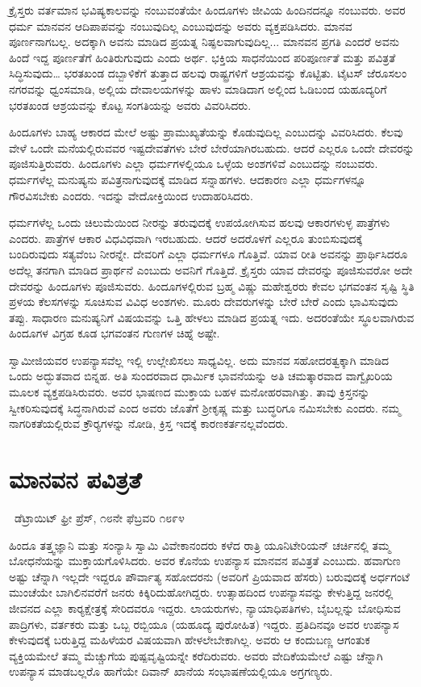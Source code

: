  ಕ್ರೈಸ್ತರು ವರ್ತಮಾನ ಭವಿಷ್ಯಕಾಲವನ್ನು ನಂಬುವಂತೆಯೇ ಹಿಂದೂಗಳು ಜೀವಿಯ ಹಿಂದಿನದನ್ನೂ ನಂಬುವರು. ಅವರ ಧರ್ಮ ಮಾನವನ ಆದಿಪಾಪವನ್ನು ನಂಬುವುದಿಲ್ಲ ಎಂಬುವುದನ್ನು ಅವರು ವ್ಯಕ್ತಪಡಿಸಿದರು. ಮಾನವ ಪೂರ್ಣನಾಗಬಲ್ಲ. ಅದಕ್ಕಾಗಿ ಅವನು ಮಾಡಿದ ಪ್ರಯತ್ನ ನಿಷ್ಫಲವಾಗುವುದಿಲ್ಲ... ಮಾನವನ ಪ್ರಗತಿ ಎಂದರೆ ಅವನು ಹಿಂದೆ ಇದ್ದ ಪೂರ್ಣತೆಗೆ ಹಿಂತಿರುಗುವುದು ಎಂದು ಅರ್ಥ. ಭಕ್ತಿಯ ಸಾಧನೆಯಿಂದ ಪರಿಪೂರ್ಣತೆ ಮತ್ತು ಪವಿತ್ರತೆ ಸಿದ್ಧಿಸುವುದು… ಭರತಖಂಡ ದಬ್ಬಾಳಿಕೆಗೆ ತುತ್ತಾದ ಹಲವು ರಾಷ್ಟ್ರಗಳಿಗೆ ಆಶ್ರಯವನ್ನು ಕೊಟ್ಟಿತು. ಟೈಟಸ್ ಜೆರೂಸಲಂ ನಗರವನ್ನು ಧ್ವಂಸಮಾಡಿ, ಅಲ್ಲಿಯ ದೇವಾಲಯಗಳನ್ನು ಹಾಳು ಮಾಡಿದಾಗ ಅಲ್ಲಿಂದ ಓಡಿಬಂದ ಯಹೂದ್ಯರಿಗೆ ಭರತಖಂಡ ಆಶ್ರಯವನ್ನು ಕೊಟ್ಟ ಸಂಗತಿಯನ್ನು ಅವರು ವಿವರಿಸಿದರು. 

 ಹಿಂದೂಗಳು ಬಾಹ್ಯ ಆಕಾರದ ಮೇಲೆ ಅಷ್ಟು ಪ್ರಾಮುಖ್ಯತೆಯನ್ನು ಕೊಡುವುದಿಲ್ಲ ಎಂಬುದನ್ನು ವಿವರಿಸಿದರು. ಕೆಲವು ವೇಳೆ ಒಂದೇ ಮನೆಯಲ್ಲಿರುವವರ ಇಷ್ಟದೇವತೆಗಳು ಬೇರೆ ಬೇರೆಯಾಗಿರಬಹುದು. ಆದರೆ ಎಲ್ಲರೂ ಒಂದೇ ದೇವರನ್ನು ಪೂಜಿಸುತ್ತಿರುವರು. ಹಿಂದೂಗಳು ಎಲ್ಲಾ ಧರ್ಮಗಳಲ್ಲಿಯೂ ಒಳ್ಳೆಯ ಅಂಶಗಳಿವೆ ಎಂಬುದನ್ನು ನಂಬುವರು. ಧರ್ಮಗಳೆಲ್ಲ ಮನುಷ್ಯನು ಪವಿತ್ರನಾಗುವುದಕ್ಕೆ ಮಾಡಿದ ಸನ್ನಾಹಗಳು. ಆದಕಾರಣ ಎಲ್ಲಾ ಧರ್ಮಗಳನ್ನೂ ಗೌರವಿಸಬೇಕು ಎಂದರು. ಇದನ್ನು ವೇದೋಕ್ತಿಯಿಂದ ಉದಾಹರಿಸಿದರು. 

 ಧರ್ಮಗಳೆಲ್ಲ ಒಂದು ಚಿಲುಮೆಯಿಂದ ನೀರನ್ನು ತರುವುದಕ್ಕೆ ಉಪಯೋಗಿಸುವ ಹಲವು ಆಕಾರಗಳುಳ್ಳ ಪಾತ್ರೆಗಳು ಎಂದರು. ಪಾತ್ರೆಗಳ ಆಕಾರ ವಿಧವಿಧವಾಗಿ ಇರಬಹುದು. ಆದರೆ ಅದರೊಳಗೆ ಎಲ್ಲರೂ ತುಂಬಿಸುವುದಕ್ಕೆ ಬಂದಿರುವುದು ಸತ್ಯವೆಂಬ ನೀರನ್ನೇ. ದೇವರಿಗೆ ಎಲ್ಲಾ ಧರ್ಮಗಳೂ ಗೊತ್ತಿವೆ. ಯಾವ ರೀತಿ ಅವನನ್ನು ಪ್ರಾರ್ಥಿಸಿದರೂ ಅದೆಲ್ಲ ತನಗಾಗಿ ಮಾಡಿದ ಪ್ರಾರ್ಥನೆ ಎಂಬುದು ಅವನಿಗೆ ಗೊತ್ತಿದೆ. ಕ್ರೈಸ್ತರು ಯಾವ ದೇವರನ್ನು ಪೂಜಿಸುವರೋ ಅದೇ ದೇವರನ್ನು ಹಿಂದೂಗಳು ಪೂಜಿಸುವರು. ಹಿಂದೂಗಳಲ್ಲಿರುವ ಬ್ರಹ್ಮ ವಿಷ್ಣು ಮಹೇಶ್ವರರು ಕೇವಲ ಭಗವಂತನ ಸೃಷ್ಟಿ ಸ್ಥಿತಿ ಪ್ರಳಯ ಕೆಲಸಗಳನ್ನು ಸೂಚಿಸುವ ವಿವಿಧ ಅಂಶಗಳು. ಮೂರು ದೇವರುಗಳನ್ನು ಬೇರೆ ಬೇರೆ ಎಂದು ಭಾವಿಸುವುದು ತಪ್ಪು. ಸಾಧಾರಣ ಮನುಷ್ಯನಿಗೆ ವಿಷಯವನ್ನು ಒತ್ತಿ ಹೇಳಲು ಮಾಡಿದ ಪ್ರಯತ್ನ ಇದು. ಅದರಂತೆಯೇ ಸ್ಥೂಲವಾಗಿರುವ ಹಿಂದೂಗಳ ವಿಗ್ರಹ ಕೂಡ ಭಗವಂತನ ಗುಣಗಳ ಚಿಹ್ನೆ ಅಷ್ಟೇ. 

 ಸ್ವಾಮೀಜಿಯವರ ಉಪನ್ಯಾಸವೆಲ್ಲ ಇಲ್ಲಿ ಉಲ್ಲೇಖಿಸಲು ಸಾಧ್ಯವಿಲ್ಲ. ಅದು ಮಾನವ ಸಹೋದರತ್ವಕ್ಕಾಗಿ ಮಾಡಿದ ಒಂದು ಅದ್ಭುತವಾದ ಬಿನ್ನಹ. ಅತಿ ಸುಂದರವಾದ ಧಾರ್ಮಿಕ ಭಾವನೆಯನ್ನು ಅತಿ ಚಮತ್ಕಾರವಾದ ವಾಗ್ವೈಖರಿಯ ಮೂಲಕ ವ್ಯಕ್ತಪಡಿಸಿರುವರು. ಅವರ ಭಾಷಣದ ಮುಕ್ತಾಯ ಬಹಳ ಮನೋಹರವಾಗಿತ್ತು. ತಾವು ಕ್ರಿಸ್ತನನ್ನು ಸ್ವೀಕರಿಸುವುದಕ್ಕೆ ಸಿದ್ಧನಾಗಿರುವೆ ಎಂದ ಅವರು ಜೊತೆಗೆ ಶ‍್ರೀಕೃಷ್ಣ ಮತ್ತು ಬುದ್ಧರಿಗೂ ನಮಿಸಬೇಕು ಎಂದರು. ನಮ್ಮ ನಾಗರಿಕತೆಯಲ್ಲಿರುವ ಕ್ರೌರ‍್ಯಗಳನ್ನು ನೋಡಿ, ಕ್ರಿಸ್ತ ಇದಕ್ಕೆ ಕಾರಣಕರ್ತನಲ್ಲವೆಂದರು.


\section*{ಮಾನವನ ಪವಿತ್ರತೆ }

~\hfill{\fontsize{11pt}{13.75pt}\selectfont ಡೆಟ್ರಾಯಿಟ್ ಫ್ರೀ ಪ್ರೆಸ್, ೧೮ನೇ ಫೆಬ್ರವರಿ ೧೮೯೪ }

 ಹಿಂದೂ ತತ್ತ್ವಜ್ಞಾನಿ ಮತ್ತು ಸಂನ್ಯಾಸಿ ಸ್ವಾಮಿ ವಿವೇಕಾನಂದರು ಕಳೆದ ರಾತ್ರಿ ಯೂನಿಟೇರಿಯನ್ ಚರ್ಚಿನಲ್ಲಿ ತಮ್ಮ ಬೋಧನೆಯನ್ನು ಮುಕ್ತಾಯಗೊಳಿಸಿದರು. ಅವರ ಕೊನೆಯ ಉಪನ್ಯಾಸ ಮಾನವನ ಪವಿತ್ರತೆ ಎಂಬುದು. ಹವಾಗುಣ ಅಷ್ಟು ಚೆನ್ನಾಗಿ ಇಲ್ಲದೇ ಇದ್ದರೂ ಪೌರ್ವಾತ್ಯ ಸಹೋದರನು (ಅವರಿಗೆ ಪ್ರಿಯವಾದ ಹೆಸರು) ಬರುವುದಕ್ಕೆ ಅರ್ಧಗಂಟೆ ಮುಂಚೆಯೇ ಬಾಗಿಲಿನವರೆಗೆ ಜನರು ಕಿಕ್ಕಿರಿದುಹೋಗಿದ್ದರು. ಉತ್ಸಾಹದಿಂದ ಉಪನ್ಯಾಸವನ್ನು ಕೇಳುತ್ತಿದ್ದ ಜನರಲ್ಲಿ ಜೀವನದ ಎಲ್ಲಾ ಕಾರ‍್ಯಕ್ಷೇತ್ರಕ್ಕೆ ಸೇರಿದವರೂ ಇದ್ದರು. ಲಾಯರುಗಳು, ನ್ಯಾಯಾಧಿಪತಿಗಳು, ಬೈಬಲ್ಲನ್ನು ಬೋಧಿಸುವ ಪಾದ್ರಿಗಳು, ವರ್ತಕರು ಮತ್ತು ಒಬ್ಬ ರಬ್ಬಿಯೂ (ಯಹೂದ್ಯ ಪುರೋಹಿತ) ಇದ್ದರು. ಪ್ರತಿದಿನವೂ ಅವರ ಉಪನ್ಯಾಸ ಕೇಳುವುದಕ್ಕೆ ಬರುತ್ತಿದ್ದ ಮಹಿಳೆಯರ ವಿಷಯವಾಗಿ ಹೇಳಲೇಬೇಕಾಗಿಲ್ಲ. ಅವರು ಆ ಕಂದುಬಣ್ಣ ಆಗಂತುಕ ವ್ಯಕ್ತಿಯಮೇಲೆ ತಮ್ಮ ಮೆಚ್ಚುಗೆಯ ಪುಷ್ಪವೃಷ್ಟಿಯನ್ನೇ ಕರೆದಿರುವರು. ಅವರು ವೇದಿಕೆಯಮೇಲೆ ಎಷ್ಟು ಚೆನ್ನಾಗಿ ಉಪನ್ಯಾಸ ಮಾಡಬಲ್ಲರೊ ಹಾಗೆಯೇ ದಿವಾನ್ ಖಾನೆಯ ಸಂಭಾಷಣೆಯಲ್ಲಿಯೂ ಅಗ್ರಗಣ್ಯರು. 

